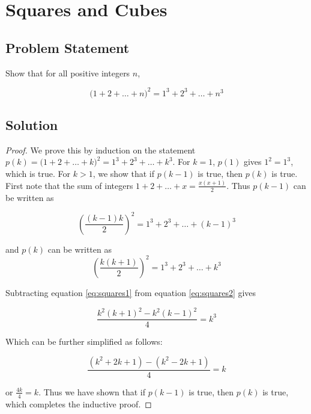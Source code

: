 \documentclass[12pt]{article}
\begin{document}
\section{Squares and Cubes}

\subsection*{Problem Statement}
Show that for all positive integers $n$,
 
\[
    \big(1 + 2 + \ldots + n\big)^2 = 1^3 + 2^3 + \ldots + n^3
\]

\subsection*{Solution}


\begin{proof}
    We prove this by induction on the statement $p(k) = \big(1 + 2 + \ldots + k\big)^2 = 1^3 + 2^3 + \ldots + k^3$. For $k = 1$, $p(1)$ gives $1^2 = 1^3$, which is true. For $k > 1$, we show that if $p(k-1)$ is true, then $p(k)$ is true. First note that the sum of integers $1 + 2 + \ldots + x = \frac{x(x+1)}{2} $. Thus $p(k-1)$ can be written as
    
    \begin{equation}\label{eq:squares1}
    \left(\frac{(k-1)k}{2}\right)^2 = 1^3 + 2^3 + \ldots + (k-1)^3
    \end{equation}
    
    and $p(k)$ can be written as
    \begin{equation}\label{eq:squares2}
    \left(\frac{k(k+1)}{2}\right)^2 = 1^3 + 2^3 + \ldots + k^3 
    \end{equation}
    
    Subtracting equation \ref{eq:squares1} from equation \ref{eq:squares2} gives 
    
    \begin{equation}\label{eq:squares3}
    \frac{k^2(k+1)^2 - k^2(k-1)^2}{4} = k^3
    \end{equation}
    
    Which can be further simplified as follows:
    
    \begin{equation}
    \frac{(k^2+2k+1) - (k^2-2k+1)}{4} = k   
    \end{equation}

    or $\frac{4k}{4} = k$. Thus we have shown that if $p(k-1)$ is true, then $p(k)$ is true, which completes the inductive proof.

\end{proof}
\end{document}
